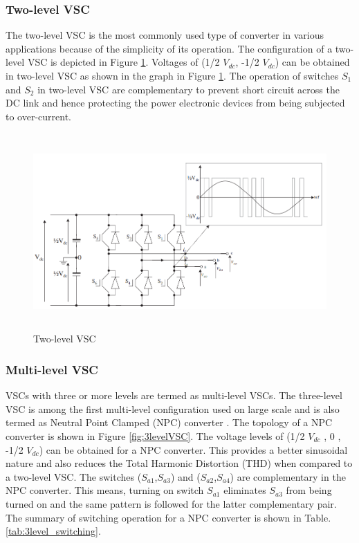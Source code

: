 \subsubsection{Two-level VSC}
The two-level \gls{VSC} is the most commonly used type of converter in various applications because of the simplicity of its operation. The configuration of a two-level \gls{VSC} is depicted in Figure \ref{fig:2levelVSC}. Voltages of (1/2 $V_{dc}$, -1/2 $V_{dc}$) can be obtained in two-level \gls{VSC} as shown in the graph in Figure \ref{fig:2levelVSC}. The operation of switches $S_{1}$ and $S_{2}$ in two-level \gls{VSC} are complementary to prevent short circuit across the \gls{DC} link and hence protecting the power electronic devices from being subjected to over-current.

\begin{figure}[H]
\centering
    \includegraphics[height = 7.5cm,width = 15.5cm]{Diagrams/Chapter_2/2levelVSC.PNG}
    \caption{Two-level VSC \cite{noauthor_appendix_2014-1}}
    \label{fig:2levelVSC}
\end{figure}

\subsubsection{Multi-level VSC}
\gls{VSC}s with three or more levels are termed as multi-level \gls{VSC}s. The three-level \gls{VSC} is among the first multi-level configuration used on large scale and is also termed as Neutral Point Clamped (\gls{NPC}) converter \cite{sharifabadi2016design}. The topology of a \gls{NPC} converter is shown in Figure \ref{fig:3levelVSC}. The voltage levels of (1/2 $V_{dc}$ , 0 , -1/2 $V_{dc}$) can be obtained for a \gls{NPC} converter. This provides a better sinusoidal nature and also reduces the Total Harmonic Distortion (THD) when compared to a two-level \gls{VSC}. The switches ($S_{a1}$,$S_{a3}$) and ($S_{a2}$,$S_{a4}$) are complementary in the \gls{NPC} converter. This means, turning on switch $S_{a1}$ eliminates $S_{a3}$ from being turned on and the same pattern is followed for the latter complementary pair. The summary of switching operation for a \gls{NPC} converter is shown in Table. \ref{tab:3level_switching}. 

